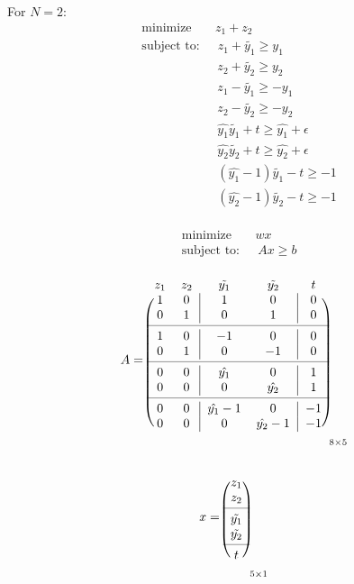 \documentclass[a4paper]{article}
\begin{document}
For $N=2$:
\begin{equation}
\begin{aligned}
&\text{minimize} \quad \: \: \: \: z_1 + z_2 \\
&\text{subject to:} \quad \: \: z_1 + \tilde{y_1}\ge y_1\\
&\qquad \qquad \qquad z_2 + \tilde{y_2}\ge y_2\\
& \qquad \qquad \qquad z_1 - \tilde{y_1} \ge - y_1\\
& \qquad \qquad \qquad z_2 - \tilde{y_2} \ge - y_2\\
& \qquad \qquad \qquad \hat{y_1}\tilde{y_1} + t \ge \hat{y_1} + \epsilon\\
& \qquad \qquad \qquad \hat{y_2}\tilde{y_2} + t \ge \hat{y_2} + \epsilon\\
& \qquad \qquad \qquad  (\hat{y_1} - 1)\tilde{y_1} - t \ge - 1\\
& \qquad \qquad \qquad  (\hat{y_2} - 1)\tilde{y_2} - t \ge - 1\\
\end{aligned}
\end{equation}


\begin{equation}
\begin{aligned}
&\text{minimize} \quad \: \: \: \: wx \\
&\text{subject to:} \quad \: \: Ax\ge b\\
\end{aligned}
\end{equation}


\[
A = \begin{blockarray}{ccccc}
z_1 & z_2 & \tilde{y_1} & \tilde{y_2} & t \\
\begin{block}{(cc|cc|c)}
1 & 0 & 1 & 0 & 0 \\
0 & 1 & 0 & 1 & 0 \\
\cmidrule{1-5}
1 & 0 & -1 & 0 & 0 \\
0 & 1 & 0 & -1 & 0 \\
\cmidrule{1-5}
0 & 0 & \hat{y_1} & 0 & 1 \\
0 & 0 & 0 & \hat{y_2} & 1 \\
\cmidrule{1-5}
0 & 0 & \hat{y_1}-1 & 0 & -1 \\
0 & 0 & 0 & \hat{y_2}-1 & -1 \\
\end{block}
\end{blockarray}_{8\times5}
\]


\[
x = \begin{blockarray}{c}
 \\
\begin{block}{(c)}
z_1 \\
z_2 \\
\cmidrule{1-1}
\tilde{y_1} \\
\tilde{y_2} \\
\cmidrule{1-1}
t \\
\end{block}
\end{blockarray}_{5\times1}
\]
\end{document}
